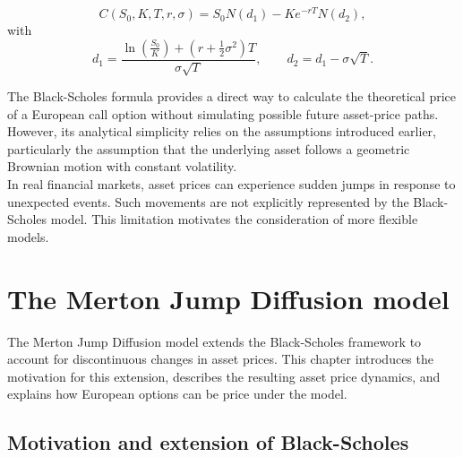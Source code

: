 \documentclass{article}
\begin{document}
	\[
	\boxed{
		C(S_0,K,T,r,\sigma)
		=
		S_0N(d_1)-Ke^{-rT}N(d_2),
	}
	\]
	with
	\[
	d_1=
	\frac{
		\ln\left(\frac{S_0}{K}\right)
		+\left(r+\frac{1}{2}\sigma^2\right)T
	}{
		\sigma\sqrt{T}
	},
	\qquad
	d_2=d_1-\sigma\sqrt{T}.
	\]
	
	The Black-Scholes formula provides a direct way to calculate the theoretical price of a European call option without simulating possible future asset-price paths. However, its analytical simplicity relies on the assumptions introduced earlier, particularly the assumption that the underlying asset follows a geometric Brownian motion with constant volatility. \\
	In real financial markets, asset prices can experience sudden jumps in response to unexpected events. Such movements are not explicitly represented by the Black-Scholes model. This limitation motivates the consideration of more flexible models.
	
	\section{The Merton Jump Diffusion model}
	
	The Merton Jump Diffusion model extends the Black-Scholes framework to account for discontinuous changes in asset prices. This chapter introduces the motivation for this extension, describes the resulting asset price dynamics, and explains how European options can be price under the model. 
	
	\subsection{Motivation and extension of Black-Scholes}
	
\end{document}
